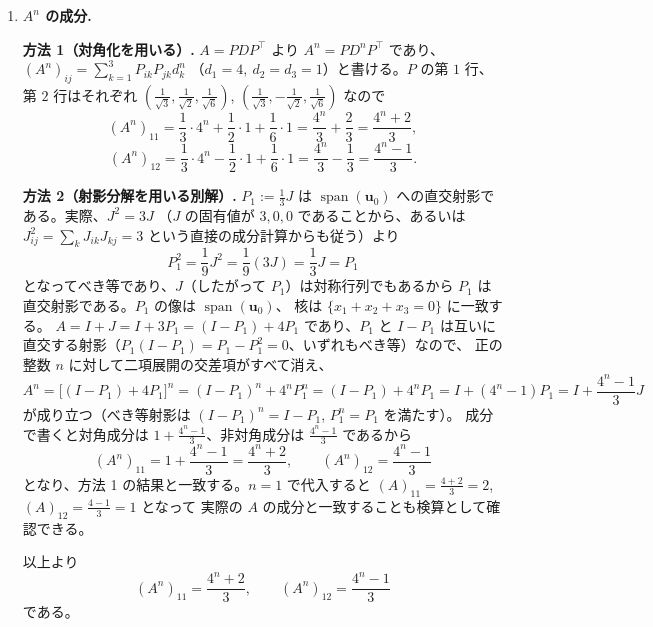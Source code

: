 \begin{enumerate}
  \item \textbf{$A^n$ の成分.}

    \textbf{方法 1（対角化を用いる）.} $A = PDP^{\top}$ より
    $A^n = PD^nP^{\top}$ であり、$(A^n)_{ij} = \sum_{k=1}^{3} P_{ik}P_{jk}d_k^n$
    （$d_1=4,\ d_2=d_3=1$）と書ける。$P$ の第 $1$ 行、第 $2$ 行はそれぞれ
    $\left(\frac{1}{\sqrt3},\frac{1}{\sqrt2},\frac{1}{\sqrt6}\right)$,
    $\left(\frac{1}{\sqrt3},-\frac{1}{\sqrt2},\frac{1}{\sqrt6}\right)$
    なので
    \[
      (A^n)_{11}
      = \frac13\cdot4^n+\frac12\cdot1+\frac16\cdot1
      = \frac{4^n}{3}+\frac23 = \frac{4^n+2}{3},
    \]
    \[
      (A^n)_{12}
      = \frac13\cdot4^n-\frac12\cdot1+\frac16\cdot1
      = \frac{4^n}{3}-\frac13 = \frac{4^n-1}{3}.
    \]

    \textbf{方法 2（射影分解を用いる別解）.} $P_1 := \frac13 J$ は
    $\operatorname{span}(\bm{u}_0)$ への直交射影である。実際、$J^2=3J$
    （$J$ の固有値が $3,0,0$ であることから、あるいは
    $J^2_{ij}=\sum_k J_{ik}J_{kj}=3$ という直接の成分計算からも従う）より
    \[
      P_1^2 = \frac19 J^2 = \frac19(3J) = \frac13 J = P_1
    \]
    となってべき等であり、$J$（したがって $P_1$）は対称行列でもあるから
    $P_1$ は直交射影である。$P_1$ の像は $\operatorname{span}(\bm{u}_0)$、
    核は $\{x_1+x_2+x_3=0\}$ に一致する。
    $A = I+J = I+3P_1 = (I-P_1)+4P_1$ であり、$P_1$ と $I-P_1$ は互いに
    直交する射影（$P_1(I-P_1)=P_1-P_1^2=0$、いずれもべき等）なので、
    正の整数 $n$ に対して二項展開の交差項がすべて消え、
    \[
      A^n = \bigl[(I-P_1)+4P_1\bigr]^n = (I-P_1)^n+4^nP_1^n
      = (I-P_1)+4^nP_1 = I+(4^n-1)P_1 = I+\frac{4^n-1}{3}J
    \]
    が成り立つ（べき等射影は $(I-P_1)^n=I-P_1$, $P_1^n=P_1$ を満たす）。
    成分で書くと対角成分は $1+\frac{4^n-1}{3}$、非対角成分は
    $\frac{4^n-1}{3}$ であるから
    \[
      (A^n)_{11} = 1+\frac{4^n-1}{3} = \frac{4^n+2}{3}, \qquad
      (A^n)_{12} = \frac{4^n-1}{3}
    \]
    となり、方法 1 の結果と一致する。$n=1$ で代入すると
    $(A)_{11}=\frac{4+2}{3}=2$, $(A)_{12}=\frac{4-1}{3}=1$ となって
    実際の $A$ の成分と一致することも検算として確認できる。

    以上より
    \[
      (A^n)_{11} = \frac{4^n+2}{3}, \qquad (A^n)_{12} = \frac{4^n-1}{3}
    \]
    である。
\end{enumerate}
